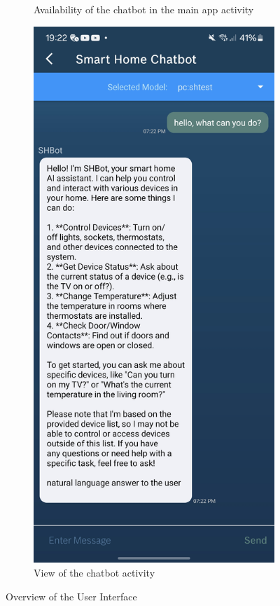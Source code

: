 \begin{figure}[t]
\begin{subfigure}{.48\textwidth}
        \caption{Availability of the chatbot in the main app activity}
        \label{fig:ui-homescreen}
      \end{subfigure} \hfill
      \begin{subfigure}{.48\textwidth}
        \includegraphics[width=\textwidth]{graphics/chatactivity.jpg}
        \caption{View of the chatbot activity}
        \label{fig:ui-chatactivity}
        \end{subfigure}
      \caption{Overview of the User Interface}
      \label{fig:ui-overview}
    \end{figure}

